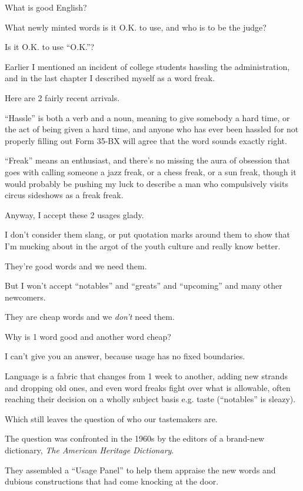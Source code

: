 \documentclass{book}
\numberwithin{equation}{section}
\begin{document}
What is good English?

What newly minted words is it O.K. to use, and who is to be the judge?

Is it O.K. to use ``O.K.''?

%
Earlier I mentioned an incident of college students hassling the administration, and in the last chapter I described myself as a word freak.

Here are 2 fairly recent arrivals.

``Hassle'' is both a verb and a noun, meaning to give somebody a hard time, or the act of being given a hard time, and anyone who has ever been hassled for not properly filling out Form 35-BX will agree that the word sounds exactly right.

``Freak'' means an enthusiast, and there's no missing the aura of obsession that goes with calling someone a jazz freak, or a chess freak, or a sun freak, though it would probably be pushing my luck to describe a man who compulsively visits circus sideshows as a freak freak.

%
Anyway, I accept these 2 usages glady.

I don't consider them slang, or put quotation marks around them to show that I'm mucking about in the argot of the youth culture and really know better.

They're good words and we need them.

But I won't accept ``notables'' and ``greats'' and ``upcoming'' and many other newcomers.

They are cheap words and we \textit{don't} need them.

Why is 1 word good and another word cheap?

I can't give you an answer, because usage has no fixed boundaries.

Language is a fabric that changes from 1 week to another, adding new strands and dropping old ones, and even word freaks fight over what is allowable, often reaching their decision on a wholly subject basis e.g. taste (``notables'' is sleazy).

Which still leaves the question of who our tastemakers are.

%
The question was confronted in the 1960s by the editors of a brand-new dictionary, \textit{The American Heritage Dictionary}.

They assembled a ``Usage Panel'' to help them appraise the new words and dubious constructions that had come knocking at the door.
\end{document}
